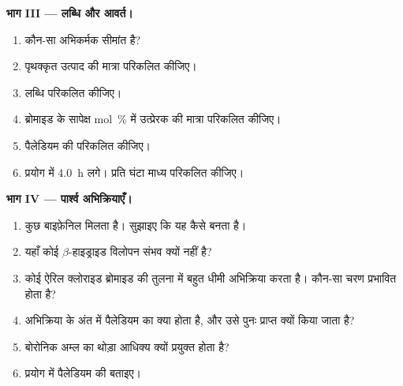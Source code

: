 \begin{problem}
\medskip
\noindent\textbf{भाग III --- लब्धि और आवर्त।}
\begin{enumerate}[resume]
  \item कौन-सा अभिकर्मक सीमांत है?
  \item पृथक्कृत उत्पाद की मात्रा परिकलित कीजिए।
  \item लब्धि परिकलित कीजिए।
  \item ब्रोमाइड के सापेक्ष mol~\% में उत्प्रेरक की मात्रा परिकलित कीजिए।
  \item पैलेडियम की  परिकलित कीजिए।
  \item प्रयोग में \qty{4.0}{h} लगे। प्रति घंटा माध्य  परिकलित कीजिए।
\end{enumerate}

\medskip
\noindent\textbf{भाग IV --- पार्श्व अभिक्रियाएँ।}
\begin{enumerate}[resume]
  \item कुछ बाइफ़ेनिल  मिलता है। सुझाइए कि यह कैसे बनता है।
  \item यहाँ कोई $\beta$-हाइड्राइड विलोपन संभव क्यों नहीं है?
  \item कोई ऐरिल क्लोराइड ब्रोमाइड की तुलना में बहुत धीमी अभिक्रिया करता है। कौन-सा चरण प्रभावित होता है?
  \item अभिक्रिया के अंत में पैलेडियम का क्या होता है, और उसे पुनः प्राप्त क्यों किया जाता है?
  \item बोरोनिक अम्ल का थोड़ा आधिक्य क्यों प्रयुक्त होता है?
  \item प्रयोग में पैलेडियम की  बताइए।
\end{enumerate}
\end{problem}
